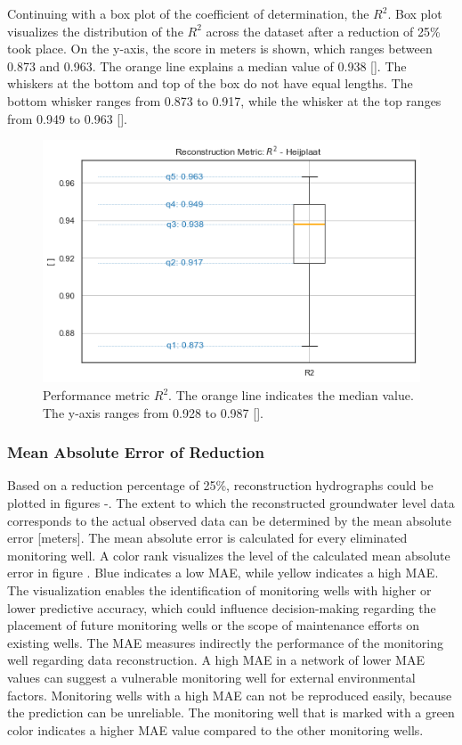 \newpage
\noindent
Continuing with a box plot of the coefficient of determination, the $R^2$. Box plot  visualizes the distribution of the $R^2$ across the dataset after a reduction of 25\% took place. On the y-axis, the score in meters is shown, which ranges between 0.873 and 0.963. The orange line explains a median value of 0.938 []. The whiskers at the bottom and top of the box do not have equal lengths. The bottom whisker ranges from 0.873 to 0.917, while the whisker at the top ranges from 0.949 to 0.963 [].

\begin{figure}[htbp]
    \centering
    \includegraphics[width=0.50\linewidth]{frontmatter/Heijplaat-fig/boxheji.png}
    \caption{Performance metric $R^2$. The orange line indicates the median value. The y-axis ranges from 0.928 to 0.987 [].}
    \label{boxheij}
\end{figure}

\subsubsection{Mean Absolute Error of Reduction}
Based on a reduction percentage of 25\%, reconstruction hydrographs could be plotted in figures -. The extent to which the reconstructed groundwater level data corresponds to the actual observed data can be determined by the mean absolute error [meters]. The mean absolute error is calculated for every eliminated monitoring well. A color rank visualizes the level of the calculated mean absolute error in figure . Blue indicates a low MAE, while yellow indicates a high MAE. The visualization enables the identification of monitoring wells with higher or lower predictive accuracy, which could influence decision-making regarding the placement of future monitoring wells or the scope of maintenance efforts on existing wells. The MAE measures indirectly the performance of the monitoring well regarding data reconstruction. A high MAE in a network of lower MAE values can suggest a vulnerable monitoring well for external environmental factors. Monitoring wells with a high MAE can not be reproduced easily, because the prediction can be unreliable. The monitoring well that is marked with a green color indicates a higher MAE value compared to the other monitoring wells. 

